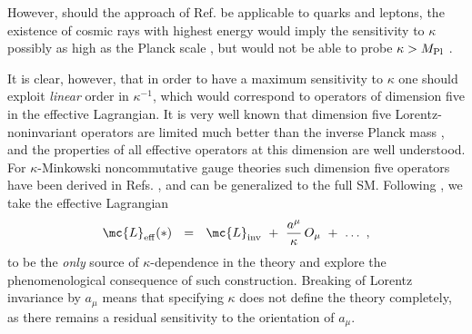 \documentclass[prl,tightenlines]{revtex4}
\begin{document}
However, should the approach of Ref. \cite{Lukierski:1991pn} be applicable 
to quarks and leptons, the existence of cosmic rays with highest energy would 
imply the sensitivity to $ \kappa$ possibly as high as the 
Planck scale \cite{Gagnon:2004xh}, but would not be able to probe $\kappa> M_{\rm Pl}$ .


It is clear, however, that in order to have a maximum  sensitivity to $\kappa$
one should exploit {\em  linear} order in $\kappa^{-1}$, which would 
correspond to operators of dimension five in the effective Lagrangian.
It is very well known that dimension five Lorentz-noninvariant 
operators are limited much better than the inverse Planck mass 
\cite{Gleiser:2001rm,Sudarsky:2002ue,Myers:2003fd,Gagnon:2004xh,Jacobson:2005bg,
GrootNibbelink:2004za,Bolokhov:2005cj,Bolokhov:2007yc,Bertolami:2004bf},
and the properties of all effective operators at this dimension are well understood.
For $\kappa$-Minkowski noncommutative gauge theories such dimension five operators have been derived in 
Refs. \cite{Dimitrijevic:2003pn,Dimitrijevic:2005xw}, and can be generalized to the full SM. 
Following \cite{Dimitrijevic:2003wv,Dimitrijevic:2003pn,Dimitrijevic:2005xw}, we take 
the effective Lagrangian
\begin{eqnarray}
\label{expansion-kappa}
	\mc{L}_{\rm eff}(*) ~~=~~ \mc{L}_{\rm inv} ~+~ \frac{a^\mu}{\kappa}\,O_\mu ~+~ \dots~,
\end{eqnarray}
to be the {\em only} source of $\kappa$-dependence in the theory
and explore the phenomenological consequence of such construction. 
Breaking of Lorentz invariance by $a_\mu$ means that 
specifying $ \kappa $ does not define the theory completely, 
as there remains a residual sensitivity to the orientation
of $a_\mu$. 
\end{document}
